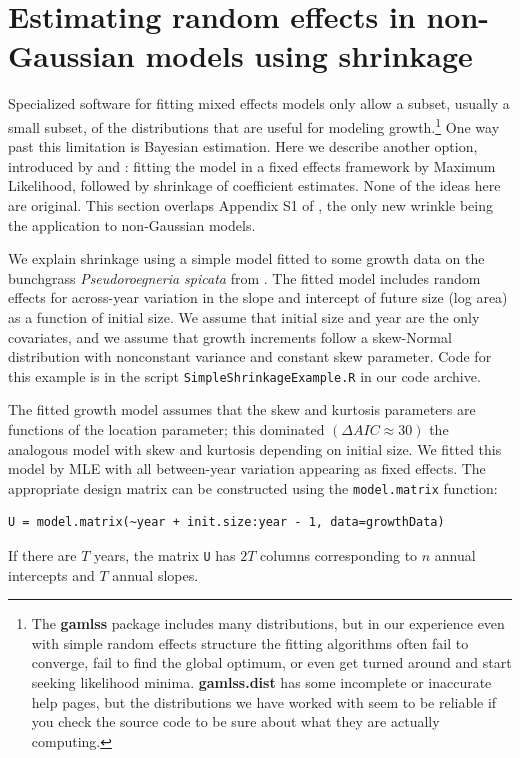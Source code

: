 \documentclass[12pt]{article}
\begin{document}
\section{Estimating random effects in non-Gaussian models using shrinkage}
\label{sec:shrinkageFits}
Specialized software for fitting mixed effects models only allow a subset, usually a small subset, of the distributions that 
are useful for modeling growth.\footnote{The \textbf{gamlss} package includes many distributions, but in our experience even with 
simple random effects structure the fitting algorithms often fail to converge, fail to find the global optimum, or   
even get turned around and start seeking likelihood minima. 
\textbf{gamlss.dist} has some incomplete or inaccurate help pages,
but the distributions we have worked with seem to be reliable if you check the source code to be sure about what they are
actually computing.} One way past this limitation is Bayesian estimation. Here we describe another option, 
introduced by \citet{link-nichols-1994} and \citet{gould-nichols-1998}: 
fitting the model in a fixed effects framework by Maximum Likelihood, followed by shrinkage of coefficient estimates. 
None of the ideas here are original. This section overlaps Appendix S1 of \citet{metcalf-etal-2015}, the only new wrinkle
being the application to non-Gaussian models.

We explain shrinkage using a simple model fitted to some growth data 
on the bunchgrass \emph{Pseudoroegneria spicata} from \cite{adler-weak-dryad}. 
The fitted model includes random effects for across-year variation in the slope and 
intercept of future size (log area) as a function of initial size. We assume that initial size 
and year are the only covariates, and we assume that growth increments 
follow a skew-Normal distribution with nonconstant variance and constant skew parameter. 
Code for this example is in the script \texttt{SimpleShrinkageExample.R} in our code archive. 

The fitted growth model assumes that the skew and kurtosis parameters are functions
of the location parameter; this dominated $(\Delta AIC \approx 30)$ the analogous  
model with skew and kurtosis depending on initial size.   
We fitted this model by MLE with all between-year variation appearing as fixed effects. 
The appropriate design matrix can be constructed using the \texttt{model.matrix} function: 
\begin{lstlisting}
U = model.matrix(~year + init.size:year - 1, data=growthData)
\end{lstlisting}
If there are $T$ years, the matrix \texttt{U} has $2T$ columns corresponding to $n$ annual 
intercepts and $T$ annual slopes. 
\end{document}
